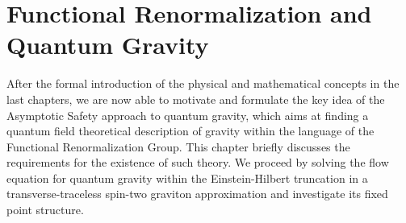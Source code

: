 \chapter{Functional Renormalization and Quantum Gravity}\label{chap:EHT}
After the formal introduction of the physical and mathematical concepts in the last chapters, we are now able to motivate and formulate the key idea of the Asymptotic Safety approach to quantum gravity, which aims at finding a quantum field theoretical description of gravity within the language of the Functional Renormalization Group. This chapter briefly discusses the requirements for the existence of such theory. We proceed by solving the flow equation for quantum gravity within the Einstein-Hilbert truncation in a transverse-traceless spin-two graviton approximation and investigate its fixed point structure. 
\vspace{-0.6cm}
